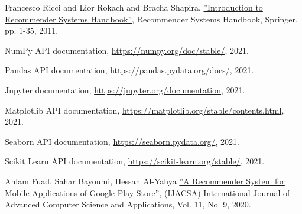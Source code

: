 \documentclass[a4paper,12pt,titlepage]{article}
\begin{document}
\newpage
{}
\begin{thebibliography}{10}

Francesco Ricci and Lior Rokach and Bracha Shapira,
\href{http://www.inf.unibz.it/~ricci/papers/intro-rec-sys-handbook.pdf}{''Introduction to Recommender Systems Handbook''},
Recommender Systems Handbook, Springer, pp. 1-35,
2011.

NumPy API documentation, 
\href{https://numpy.org/doc/stable/}{https://numpy.org/doc/stable/},
2021.

Pandas API documentation, 
\href{https://pandas.pydata.org/docs/}{https://pandas.pydata.org/docs/},
2021.

Jupyter documentation, 
\href{https://jupyter.org/documentation}{https://jupyter.org/documentation},
2021.

Matplotlib API documentation, 
\href{https://matplotlib.org/stable/contents.html}{https://matplotlib.org/stable/contents.html},
2021.

Seaborn API documentation, 
\href{https://seaborn.pydata.org/}{https://seaborn.pydata.org/},
2021.

Scikit Learn API documentation, 
\href{https://scikit-learn.org/stable/}{https://scikit-learn.org/stable/},
2021.

Ahlam Fuad, Sahar Bayoumi, Hessah Al-Yahya
\href{https://thesai.org/Downloads/Volume11No9/Paper_6-A_Recommender_System_for_Mobile_Applications.pdf}{''A Recommender System for Mobile Applications of Google Play Store''},
(IJACSA) International Journal of Advanced Computer Science and Applications,
Vol. 11, No. 9, 
2020.



\end{thebibliography}
\end{document}
